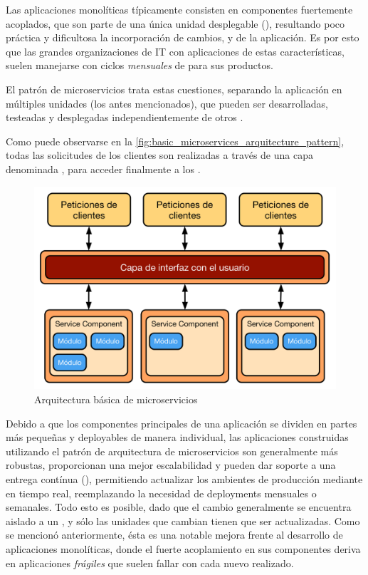 Las aplicaciones monolíticas típicamente consisten en componentes fuertemente acoplados, que son parte de una única unidad desplegable (), resultando poco práctica y dificultosa la incorporación de cambios,  y  de la aplicación. Es por esto que las grandes organizaciones de IT con aplicaciones de estas características, suelen manejarse con ciclos \textit{mensuales} de  para sus productos.

El patrón de microservicios trata estas cuestiones, separando la aplicación en múltiples unidades  (los  antes mencionados), que pueden ser desarrolladas, testeadas y desplegadas independientemente de otros .\cite[p.~27]{richards2015}

Como puede observarse en la \autoref{fig:basic_microservices_arquitecture_pattern}, todas las solicitudes de los clientes son realizadas a través de una capa denominada , para acceder finalmente a los .

\begin{figure}[H]
  \includegraphics[width=\linewidth]{src/images/02-capitulo-2/arquitectura-microservicios-basica.png}
  \caption{Arquitectura básica de microservicios}
  \label{fig:basic_microservices_arquitecture_pattern}
\end{figure}

Debido a que los componentes principales de una aplicación se dividen en partes más pequeñas y deployables de manera individual, las aplicaciones construidas utilizando el patrón de arquitectura de microservicios son generalmente más robustas, proporcionan una mejor escalabilidad y pueden dar soporte a una entrega contínua (), permitiendo actualizar los ambientes de producción mediante  en tiempo real, reemplazando la necesidad de deployments mensuales o semanales. \cite[p.~33]{richards2015} Todo esto es posible, dado que el cambio generalmente se encuentra aislado a un , y sólo las unidades que cambian tienen que ser actualizadas. Como se mencionó anteriormente, ésta es una notable mejora frente al desarrollo de aplicaciones monolíticas, donde el fuerte acoplamiento en sus componentes deriva en aplicaciones \textit{frágiles} que suelen fallar con cada nuevo  realizado.


